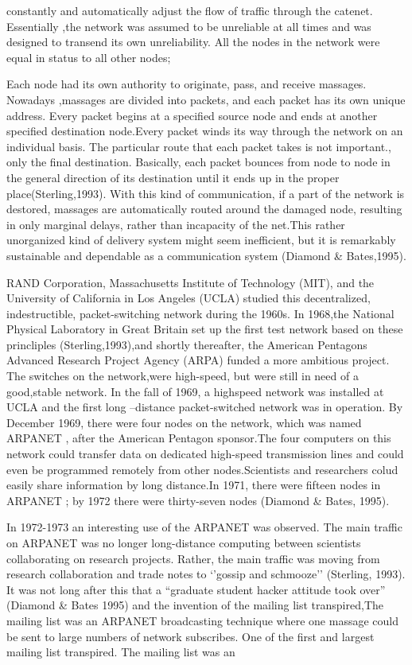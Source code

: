 \documentclass{book}
\begin{document}
\noindent \begin{flushleft}
constantly and automatically adjust the flow of traffic through the catenet. Essentially ,the network was assumed to be unreliable at all times and was designed to transend its own unreliability. All the nodes in the network were equal in status to all other nodes;

\noindent Each node had its own authority to originate, pass, and receive massages. Nowadays ,massages are divided into packets, and each packet has its own unique address. Every packet begins at a specified source node and ends at another specified destination node.Every packet winds its way through the network on an individual basis. The particular route that each packet takes is not important., only the final destination. Basically, each packet bounces from node to node in the general direction of its destination until it ends up in the proper place(Sterling,1993). With this kind of communication, if a part of the network is destored, massages are automatically routed around the damaged node, resulting in only marginal delays, rather than incapacity of the net.This rather unorganized kind of delivery system might seem inefficient, but it is remarkably sustainable and dependable as a communication system (Diamond \& Bates,1995).

\noindent      RAND Corporation, Massachusetts Institute of Technology (MIT), and the University of California in Los Angeles (UCLA) studied this decentralized, indestructible, packet-switching network during the 1960s. In 1968,the National Physical Laboratory in Great Britain set up the first test network based on these princliples (Sterling,1993),and shortly thereafter, the American Pentagons Advanced Research Project Agency (ARPA) funded a more ambitious project. The switches on the network,were high-speed, but were still in need of a good,stable network. In the fall of 1969, a highspeed network was installed at UCLA and the first long --distance packet-switched network was in operation. By December 1969, there were four nodes on the network, which was named ARPANET , after the American Pentagon sponsor.The four computers on this network could transfer data on dedicated high-speed transmission lines and could even be programmed remotely from other nodes.Scientists and researchers colud easily share information by long distance.In 1971, there were fifteen nodes in ARPANET ; by 1972 there were thirty-seven nodes (Diamond \& Bates, 1995).

\noindent      In 1972-1973 an interesting use of the ARPANET was observed. The main traffic on ARPANET was no longer long-distance computing between scientists collaborating on research projects. Rather, the main traffic was moving from research collaboration and trade notes to `'gossip and schmooze'' (Sterling, 1993). It was not long after this that a ``graduate student hacker attitude took over'' (Diamond \& Bates 1995) and the invention of the mailing list transpired,The mailing list was an ARPANET broadcasting technique where one massage could be sent to large numbers of network subscribes. One of the first and largest mailing list transpired. The mailing list was an


\end{flushleft}
\end{document}
